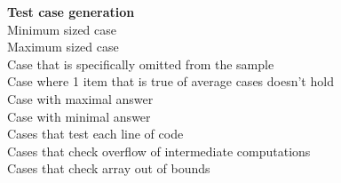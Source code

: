 \textbf{Test case generation} \\
Minimum sized case \\
Maximum sized case \\
Case that is specifically omitted from the sample \\
Case where 1 item that is true of average cases doesn't hold \\
Case with maximal answer \\
Case with minimal answer \\
Cases that test each line of code \\
Cases that check overflow of intermediate computations \\
Cases that check array out of bounds

\newpage